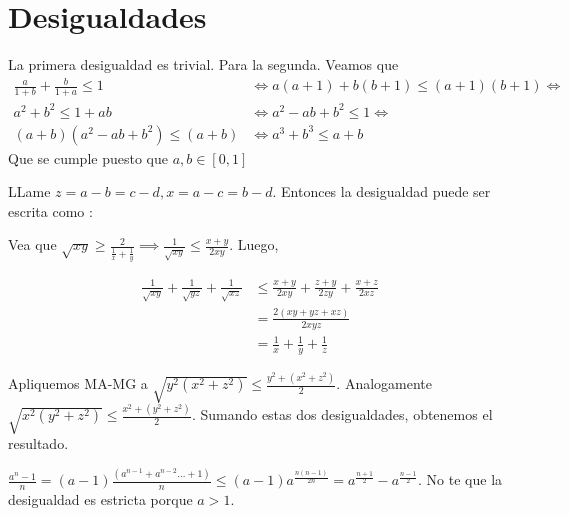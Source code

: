 \section{Desigualdades}

\begin{sol}
	La primera desigualdad es trivial. Para la segunda. Veamos que 
	\begin{align}
	\frac{a}{1+b}+\frac{b}{1+a} \leq 1 &\iff a(a+1) + b(b+1) \leq (a+1)(b+1) \iff \\
	a^2 + b^2 \leq 1+ab &\iff a^2-ab+b^2 \leq 1 \iff \\
	(a+b)(a^2-ab+b^2) \leq (a+b) &\iff a^3+b^3 \leq a+b
	\end{align}
	Que se cumple puesto que $a,b \in [0,1]$
\end{sol}

\begin{sol}
	LLame $z = a-b = c-d, x = a-c=b-d$. Entonces la desigualdad puede ser escrita como :
	
	
\end{sol}


\begin{sol}
	Vea que $\sqrt{xy} \geq \frac{2}{\frac{1}{x}+\frac{1}{y}} \implies \frac{1}{\sqrt{xy}} \leq \frac{x+y}{2xy}$. Luego,
	
	\begin{align}
	\frac{1}{\sqrt{xy}} + \frac{1}{\sqrt{yz}} + \frac{1}{\sqrt{xz}} &\leq \frac{x+y}{2xy} + \frac{z+y}{2zy} + \frac{x+z}{2xz} \\
	& = \frac{2(xy + yz +xz)}{2xyz} \\
	& = \frac{1}{x} + \frac{1}{y} + \frac{1}{z}
	\end{align}
\end{sol}


\begin{sol}
	Apliquemos MA-MG a $\sqrt{y^2(x^2+z^2)} \leq \frac{ y^2 + (x^2+z^2)}{2}$. Analogamente $\sqrt{x^2(y^2+z^2)} \leq \frac{ x^2 + (y^2+z^2)}{2}$. Sumando estas dos desigualdades, obtenemos el resultado.
\end{sol}

\begin{sol}
	$\frac{a^n-1}{n} = (a-1)\frac{(a^{n-1} + a^{n-2} \dots +1 ) }{n}\leq (a-1) a^{\frac{n(n-1)}{2n}} = a^{\frac{n+1}{2}} - a^{\frac{n-1}{2}}$. No te que la desigualdad es estricta porque $a>1$. 
\end{sol}

